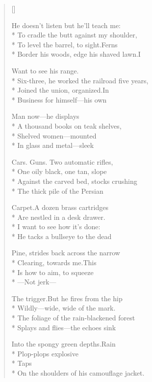 \label{ch:target_practice}
\settowidth{\versewidth}{Border his woods, edge his shaved lawn.\qquad I}
\begin{verse}[\versewidth]

He doesn't listen but he'll teach me:\\*
To cradle the butt against my shoulder, \\*
To level the barrel, to sight.\quad Ferns\\*
Border his woods, edge his shaved lawn.\qquad I

Want to see his range.\\*
Six-three, he worked the railroad five years,\\*
Joined the union, organized.\quad In\\*
Business for himself---his own

Man now---he displays\\*
A thousand books on teak shelves,\\*
Shelved women---mounted\\*
In glass and metal---sleek

Cars. Guns. Two automatic rifles,\\*
One oily black, one tan, slope\\*
Against the carved bed, stocks crushing\\*
The thick pile of the Persian

Carpet.\quad A dozen brass cartridges\\*
Are nestled in a desk drawer.\\*
I want to see how it's done:\\*
He tacks a bullseye to the dead

Pine, strides back across the narrow\\*
Clearing, towards me.\quad This\\*
Is how to aim, to squeeze\\*
---Not jerk---

The trigger.\quad But he fires from the hip\\*
Wildly---wide, wide of the mark.\\*
The foliage of the rain-blackened forest\\*
Splays and flies---the echoes sink

Into the spongy green depths.\quad Rain\\*
Plop-plops explosive\\*
Taps\\*
On the shoulders of his camouflage jacket.
\end{verse}
